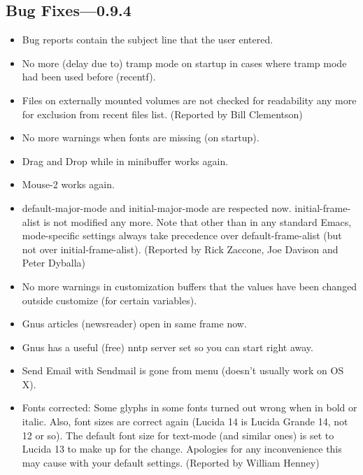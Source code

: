\subsection{Bug Fixes---0.9.4}

\begin{itemize}
\item Bug reports contain the subject line that the user entered.

\item No more (delay due to) tramp mode on startup in cases where tramp
    mode had been used before (recentf).

\item Files on externally mounted volumes are not checked for readability
    any more for exclusion from recent files list.
    (Reported by Bill Clementson)

\item No more warnings when fonts are missing (on startup).

\item Drag and Drop while in minibuffer works again.

\item Mouse-2 works again.

\item default-major-mode and initial-major-mode are respected now.
    initial-frame-alist is not modified any more.
    Note that other than in any standard Emacs, mode-specific settings
    always take precedence over default-frame-alist (but not over
    initial-frame-alist).
    (Reported by Rick Zaccone, Joe Davison and Peter Dyballa)

\item No more warnings in customization buffers that the values have
    been changed outside customize (for certain variables).

\item Gnus articles (newsreader) open in same frame now.

\item Gnus has a useful (free) nntp server set so you can start right
    away.

\item Send Email with Sendmail is gone from menu (doesn't usually work
    on  OS X).

\item Fonts corrected: Some glyphs in some fonts turned out wrong when
    in bold or italic. Also, font sizes are correct again (Lucida 14
    is Lucida Grande 14, not 12 or so). The default font size for
    text-mode (and similar ones) is set to Lucida 13 to make up for
    the change.  Apologies for any inconvenience this may cause with
    your default settings. (Reported by William Henney)


\end{itemize}
